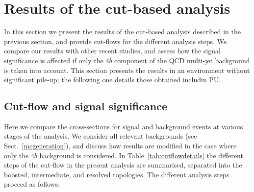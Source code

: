\section{Results of the cut-based analysis}

\label{sec:results}

In this section we present the results of the 
cut-based analysis described in the previous section, and provide 
cut-flows for the different analysis steps.
%
We
compare our results with other recent studies,
and assess how the signal significance
is affected if only the $4b$ component of the
QCD multi-jet background is taken into account.
%
This section presents the results in an environment without significant pile-up; the following one details those obtained includin PU.

\subsection{Cut-flow and signal significance}

Here we compare the cross-sections for
signal and background events at various
stages of the analysis.
%
We consider all relevant backgrounds (see Sect.~\ref{mcgeneration}),
and discuss how results are modified in the case where only the $4b$
background is considered.
%
In Table~\ref{tab:cutflowdetails}
the different
steps of the cut-flow in the present analysis are summarised,
separated into the boosted, intermediate,
    and resolved topologies.
    The different analysis steps proceed as follows:
   

